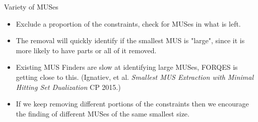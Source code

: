 \documentclass{beamer}
\begin{document}
\begin{frame}{Variety of MUSes}
\begin{itemize}
    \item Exclude a proportion of the constraints, check for MUSes in what is left.
    \item The removal will quickly identify if the smallest MUS is "large", since it is more likely to have parts or all of it removed.
    \item Existing MUS Finders are slow at identifying large MUSes, FORQES is getting close to this. (Ignatiev, et al. \emph{Smallest MUS Extraction with Minimal Hitting Set Dualization} CP 2015.)
    \item If we keep removing different portions of the constraints then we encourage the finding of different MUSes of the same smallest size.
\end{itemize}
\end{frame}



\end{document}
